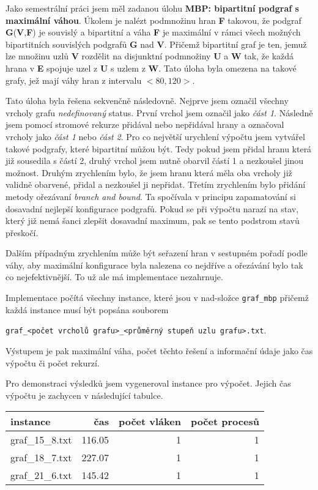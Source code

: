 Jako semestrální práci jsem měl zadanou úlohu \textbf{MBP: bipartitní podgraf s maximální váhou}.
Úkolem je nalézt podmnožinu hran \textbf{F} takovou, že podgraf \textbf{G}(\textbf{V},\textbf{F}) je souvislý a bipartitní a váha \textbf{F} je maximální v rámci všech možných bipartitních souvislých podgrafů \textbf{G} nad \textbf{V}. Přičemž bipartitní graf je ten, jemuž lze množinu uzlů \textbf{V} rozdělit na disjunktní podmnožiny \textbf{U} a \textbf{W} tak, že každá hrana v \textbf{E} spojuje uzel z \textbf{U} s uzlem z \textbf{W}. 
Tato úloha byla omezena na takové grafy, jež mají váhy hran z intervalu \( <80, 120> \).

Tato úloha byla řešena sekvenčně následovně. Nejprve jsem označil všechny vrcholy grafu \textit{nedefinovaný} status. První vrchol jsem označil jako \textit{část 1}. Následně jsem pomocí stromové rekurze přidával nebo nepřidával hrany a označoval vrcholy jako \textit{část 1} nebo \textit{část 2}.
Pro co největší urychlení výpočtu jsem vytvářel takové podgrafy, které bipartitní můžou být. Tedy pokud jsem přidal hranu která již sousedila s částí 2, druhý vrchol jsem nutně obarvil částí 1 a nezkoušel jinou možnost.
Druhým zrychlením bylo, že jsem hranu která měla oba vrcholy již validně obarvené, přidal a nezkoušel ji nepřidat.
Třetím zrychlením bylo přidání metody ořezávaní \textit{branch and bound}. Ta spočívala v principu zapamatování si dosavadní nejlepší konfigurace podgrafů. Pokud se při výpočtu narazí na stav, který již nemá šanci zlepšit dosavadní maximum, pak se tento podstrom stavů přeskočí.

Dalším případným zrychlením může být seřazení hran v sestupném pořadí podle váhy, aby maximální konfigurace byla nalezena co nejdříve a ořezávání bylo tak co nejefektivnější. To už ale má implementace nezahrnuje.

Implementace počítá všechny instance, které jsou v nad-složce \verb|graf_mbp|
přičemž každá instance musí být popsána souborem 

\verb|graf_<počet vrcholů grafu>_<průměrný stupeň uzlu grafu>.txt|.

Výstupem je pak maximální váha, počet těchto řešení a informační údaje jako čas výpočtu či počet rekurzí.

Pro demonstraci výsledků jsem vygeneroval instance pro výpočet. 
Jejich čas výpočtu je zachycen v následující tabulce.

\FloatBarrier
\begin{table}[]
    \begin{tabular}{l|rrr}
    {}                  instance &    čas &  počet vláken &  počet procesů \\
    \hline
    graf\_15\_8.txt &  116.05 &           1 &         1 \\
    graf\_18\_7.txt &  227.07 &           1 &         1 \\
    graf\_21\_6.txt &  145.42 &           1 &         1 \\
    \end{tabular}
\end{table}
\FloatBarrier
